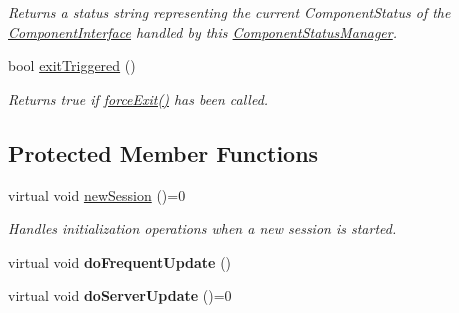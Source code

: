 \begin{DoxyCompactItemize}
\begin{DoxyCompactList}\small\item\em Returns a status string representing the current Component\-Status of the \hyperlink{class_component_interface}{Component\-Interface} handled by this \hyperlink{class_component_status_manager}{Component\-Status\-Manager}. \end{DoxyCompactList}\item 
\hypertarget{class_component_status_manager_a36bba277d0330af5cbb190eeeb68daeb}{bool \hyperlink{class_component_status_manager_a36bba277d0330af5cbb190eeeb68daeb}{exit\-Triggered} ()}\label{class_component_status_manager_a36bba277d0330af5cbb190eeeb68daeb}

\begin{DoxyCompactList}\small\item\em Returns true if \hyperlink{class_component_status_manager_a2fd4ac0e719ade2c696dd8b468c76f07}{force\-Exit()} has been called. \end{DoxyCompactList}\end{DoxyCompactItemize}
\subsection*{Protected Member Functions}
\begin{DoxyCompactItemize}
\item 
\hypertarget{class_component_status_manager_a1af23b4bf43eac138ca122be16b37b46}{virtual void \hyperlink{class_component_status_manager_a1af23b4bf43eac138ca122be16b37b46}{new\-Session} ()=0}\label{class_component_status_manager_a1af23b4bf43eac138ca122be16b37b46}

\begin{DoxyCompactList}\small\item\em Handles initialization operations when a new session is started. \end{DoxyCompactList}\item 
\hypertarget{class_component_status_manager_ab8da851957cd9e1f7f48d345f73fcf2f}{virtual void {\bfseries do\-Frequent\-Update} ()}\label{class_component_status_manager_ab8da851957cd9e1f7f48d345f73fcf2f}

\item 
\hypertarget{class_component_status_manager_aad4af3be8431d94994bdd47488b4349f}{virtual void {\bfseries do\-Server\-Update} ()=0}\label{class_component_status_manager_aad4af3be8431d94994bdd47488b4349f}

\end{DoxyCompactItemize}


